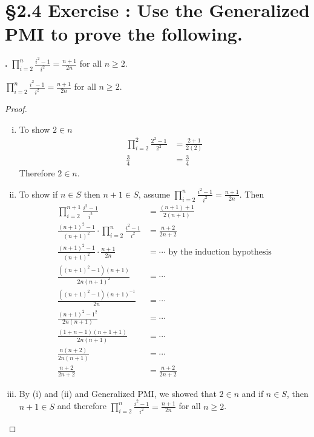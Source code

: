 \documentclass[a4paper,11pt]{article}
\begin{document}
\section*{\S 2.4 Exercise : Use the Generalized PMI to prove the following.}
\textbf{.}
\(\prod\limits_{i=2}^n \frac{i^2-1}{i^2} = \frac{n+1}{2n}\) for all \(n \geq 2\).
\begin{theorem1}
\(\prod\limits_{i=2}^n \frac{i^2-1}{i^2} = \frac{n+1}{2n}\) for all \(n \geq 2\).
\begin{proof}
    \begin{enumerate}[(i)]
    \item To show \(2 \in n\)
    \begin{align*}
      \prod\limits_{i=2}^2 \frac{2^2-1}{2^2} &= \frac{2+1}{2{(2)}}\\
      \frac{3}{4} &= \frac{3}{4}
    \end{align*}
    Therefore \(2 \in n\).
    \newpage
    \item To show if \(n \in S\) then \(n+1 \in S\), assume \(\prod\limits_{i=2}^n \frac{i^2-1}{i^2} = 
    \frac{n+1}{2n}\). Then\\
    \begin{align*}
      \prod\limits_{i=2}^{n+1} \frac{i^2-1}{i^2} &= 
    \frac{{(n+1)}+1}{2{(n+1)}}\\
    \frac{{(n+1)}^2-1}{{(n+1)}^2} \cdot \prod\limits_{i=2}^n \frac{i^2-1}{i^2} 
    &= \frac{n+2}{2n+2}\\
    \frac{{(n+1)}^2-1}{{(n+1)}^2} \cdot \frac{n+1}{2n} 
    &= \cdots \text{ by the induction hypothesis}\\
    \frac{({(n+1)}^2-1){(n+1)}}{2n(n+1)^2} &= \cdots\\
    \frac{({(n+1)}^2-1){(n+1)}^{-1}}{2n} &= \cdots\\
    \frac{{(n+1)}^2-1^2}{2n{(n+1)}} &= \cdots\\
    \frac{{(1+n-1)}{(n+1+1)}}{2n{(n+1)}} &= \cdots\\
    \frac{n{(n+2)}}{2n{(n+1)}} &= \cdots\\
    \frac{n+2}{2n+2} &= \frac{n+2}{2n+2}
    \end{align*}
    \item By {(i)} and {(ii)} and Generalized PMI, we showed that \(2 \in n\) 
    and if \(n \in S\), then \(n+1 \in S\) and therefore \(\prod\limits_{i=2}^n \frac{i^2-1}{i^2} = \frac{n+1}{2n}\) for all \(n \geq 
    2\).
  \end{enumerate}
\end{proof}  
\end{theorem1}
\end{document}
